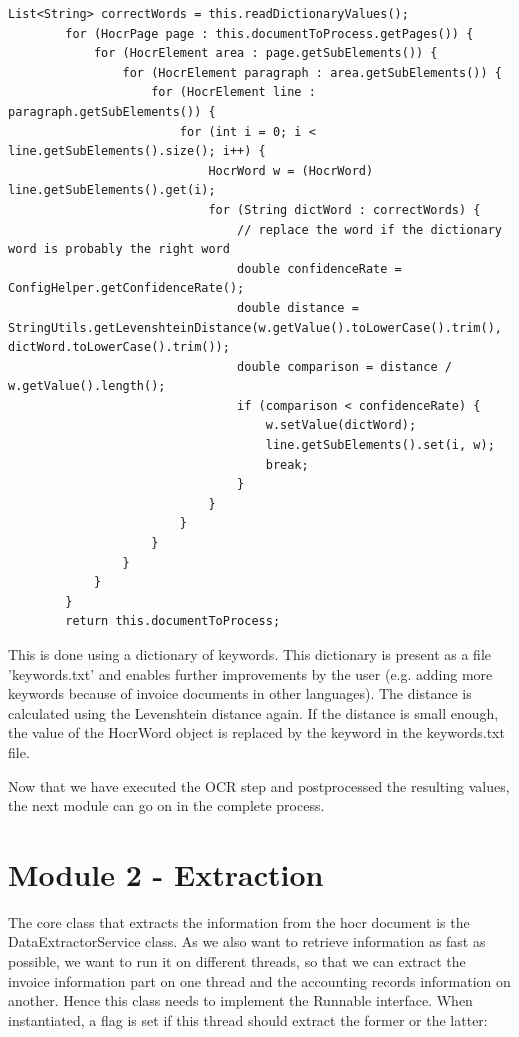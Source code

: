 \begin{lstlisting}[caption={Postprocessing the hocr document}]
        List<String> correctWords = this.readDictionaryValues();
        for (HocrPage page : this.documentToProcess.getPages()) {
            for (HocrElement area : page.getSubElements()) {
                for (HocrElement paragraph : area.getSubElements()) {
                    for (HocrElement line : paragraph.getSubElements()) {
                        for (int i = 0; i < line.getSubElements().size(); i++) {
                            HocrWord w = (HocrWord) line.getSubElements().get(i);
                            for (String dictWord : correctWords) {
                                // replace the word if the dictionary word is probably the right word
                                double confidenceRate = ConfigHelper.getConfidenceRate();
                                double distance = StringUtils.getLevenshteinDistance(w.getValue().toLowerCase().trim(), dictWord.toLowerCase().trim());
                                double comparison = distance / w.getValue().length();
                                if (comparison < confidenceRate) {
                                    w.setValue(dictWord);
                                    line.getSubElements().set(i, w);
                                    break;
                                }
                            }
                        }
                    }
                }
            }
        }
        return this.documentToProcess;
\end{lstlisting}

This is done using a dictionary of keywords. This dictionary is present as a file 'keywords.txt' and enables further improvements by the user (e.g. adding more keywords because of invoice documents in other languages).
The distance is calculated using the Levenshtein distance again. If the distance is small enough, the value of the HocrWord object is replaced by the keyword in the keywords.txt file.

Now that we have executed the OCR step and postprocessed the resulting values, the next module can go on in the complete process.

\section{Module 2 - Extraction}
\label{sec5.5}

The core class that extracts the information from the hocr document is the DataExtractorService class. As we also want to retrieve information as fast as possible, we want to run it on different threads, so that we can extract the invoice information part on one thread and the accounting records information on another. Hence this class needs to implement the Runnable interface. When instantiated, a flag is set if this thread should extract the former or the latter:

